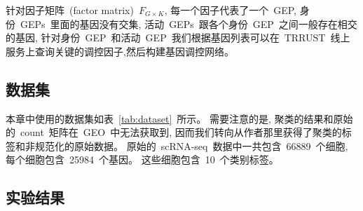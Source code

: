 针对因子矩阵~(factor matrix)~$F_{G \times K}$, 每一个因子代表了一个~GEP, 
身份~GEPs~里面的基因没有交集, 活动~GEPs~跟各个身份~GEP~之间一般存在相交的基因, 
针对身份~GEP~和活动~GEP~我们根据基因列表可以在~TRRUST~线上服务上查询关键的调控因子,然后构建基因调控网络。

\subsection{数据集}
本章中使用的数据集如表~\ref{tab:dataset}~所示。
需要注意的是, 聚类的结果和原始的~count~矩阵在~GEO~中无法获取到,
因而我们转向从作者那里获得了聚类的标签和非规范化的原始数据。
原始的~scRNA-seq~数据中一共包含~66889~个细胞, 每个细胞包含~25984~个基因。
这些细胞包含~10~个类别标签。

\begin{table}[!htbp]
    \caption{\label{tab:dataset}使用的公开数据集} 
\end{table}

\subsection{实验结果}
